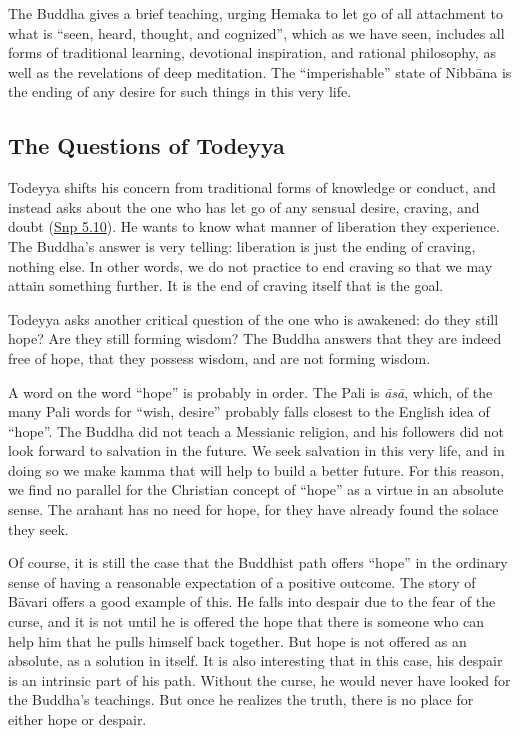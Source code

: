 \documentclass[12pt,openany]{book}%
\begin{document}
The Buddha gives a brief teaching, urging Hemaka to let go of all attachment to what is “seen, heard, thought, and cognized”, which as we have seen, includes all forms of traditional learning, devotional inspiration, and rational philosophy, as well as the revelations of deep meditation. The “imperishable” state of \textsanskrit{Nibbāna} is the ending of any desire for such things in this very life.

\subsection*{The Questions of Todeyya}

Todeyya shifts his concern from traditional forms of knowledge or conduct, and instead asks about the one who has let go of any sensual desire, craving, and doubt (\href{https://suttacentral.net/snp5.10/en/sujato}{Snp 5.10}). He wants to know what manner of liberation they experience. The Buddha’s answer is very telling: liberation is just the ending of craving, nothing else. In other words, we do not practice to end craving so that we may attain something further. It is the end of craving itself that is the goal.

Todeyya asks another critical question of the one who is awakened: do they still hope? Are they still forming wisdom? The Buddha answers that they are indeed free of hope, that they possess wisdom, and are not forming wisdom.

A word on the word “hope” is probably in order. The Pali is \textit{\textsanskrit{āsā}}, which, of the many Pali words for “wish, desire” probably falls closest to the English idea of “hope”. The Buddha did not teach a Messianic religion, and his followers did not look forward to salvation in the future. We seek salvation in this very life, and in doing so we make kamma that will help to build a better future. For this reason, we find no parallel for the Christian concept of “hope” as a virtue in an absolute sense. The arahant has no need for hope, for they have already found the solace they seek.

Of course, it is still the case that the Buddhist path offers “hope” in the ordinary sense of having a reasonable expectation of a positive outcome. The story of \textsanskrit{Bāvari} offers a good example of this. He falls into despair due to the fear of the curse, and it is not until he is offered the hope that there is someone who can help him that he pulls himself back together. But hope is not offered as an absolute, as a solution in itself. It is also interesting that in this case, his despair is an intrinsic part of his path. Without the curse, he would never have looked for the Buddha’s teachings. But once he realizes the truth, there is no place for either hope or despair.
\end{document}
